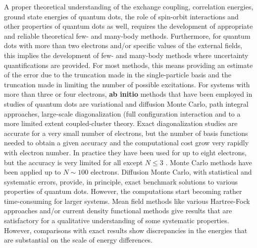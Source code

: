 \documentclass[%
oneside,                 %
final,                   %
10pt]{article}
\begin{document}
A proper theoretical understanding of the exchange coupling,
correlation energies, ground state energies of quantum dots, the role
of spin-orbit interactions and other properties of quantum dots as
well, requires the development of appropriate and reliable theoretical
few- and many-body methods.  Furthermore, for quantum dots with more
than two electrons and/or specific values of the external fields, this
implies the development of few- and many-body methods where
uncertainty quantifications are provided.  For most methods, this
means providing an estimate of the error due to the truncation made in
the single-particle basis and the truncation made in limiting the
number of possible excitations.  For systems with more than three or
four electrons, \textbf{ab initio} methods that have been employed in
studies of quantum dots are variational and diffusion Monte Carlo, path integral approaches, large-scale diagonalization (full configuration
interaction and to a more
limited extent coupled-cluster theory.
Exact diagonalization studies are accurate for a very small number of
electrons, but the number of basis functions needed to obtain a given
accuracy and the computational cost grow very rapidly with electron
number.  In practice they have been used for up to eight
electrons, but the accuracy is very
limited for all except $N\le 3$ .  Monte Carlo methods have been
applied up to $N\sim 100$ electrons. Diffusion Monte Carlo, with
statistical and systematic errors, provide, in principle, exact
benchmark solutions to various properties of quantum dots. However,
the computations start becoming rather time-consuming for larger
systems.  Mean field methods like various Hartree-Fock approaches and/or 
current density functional
methods give results that are
satisfactory for a qualitative understanding of some systematic
properties. However, comparisons with exact results show discrepancies
in the energies that are substantial on the scale of energy
differences.
\end{document}
